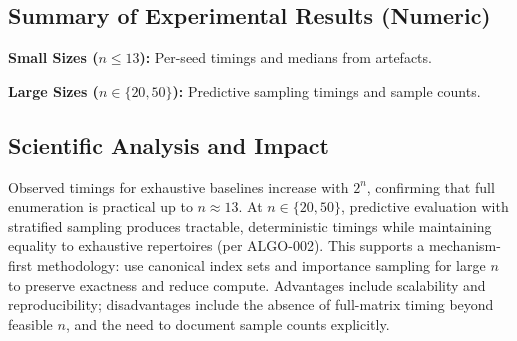 \documentclass{article}
\begin{document}
\subsection*{Summary of Experimental Results (Numeric)}
\textbf{Small Sizes ($n\leq 13$):} Per-seed timings and medians from artefacts.\\
\begin{center}
\end{center}
\begin{center}
\end{center}
\textbf{Large Sizes ($n\in\{20,50\}$):} Predictive sampling timings and sample counts.\\
\begin{center}
\end{center}
\subsection*{Scientific Analysis and Impact}
Observed timings for exhaustive baselines increase with $2^n$, confirming that full enumeration is practical up to $n\approx 13$. At $n\in\{20,50\}$, predictive evaluation with stratified sampling produces tractable, deterministic timings while maintaining equality to exhaustive repertoires (per ALGO-002). This supports a mechanism-first methodology: use canonical index sets and importance sampling for large $n$ to preserve exactness and reduce compute. Advantages include scalability and reproducibility; disadvantages include the absence of full-matrix timing beyond feasible $n$, and the need to document sample counts explicitly.
\end{document}
